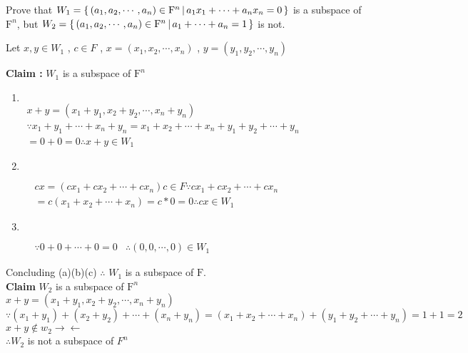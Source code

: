 Prove that $W_1 = \left\{ \,\left(a_1,a_2,\cdots,a_n\right) \in \mathrm{F}^n \,|\, a_1x_1+\cdots+a_nx_n = 0 \,\right\}$ is a subspace of $\mathrm{F}^n$, but $W_2 = \left\{ \, \left( a_1,a_2,\cdots ,a_n \right) \in \mathrm{F}^n \, | \, a_1+\cdots+a_n = 1 \,\right\}$ is not.

\begin{tcolorbox}
\begin{solution}
	Let $x,y \in W_1$ , $c \in F$ , $x = (x_1,x_2,\cdots,x_n)$ , $y=(y_1,y_2,\cdots,y_n)$
	
	\textbf{Claim : }$W_1$ is a subspace of $\mathrm{F}^n$
	\begin{enumerate}
		\item $ $\\ 
		$\begin{array}{ll}
		x+y  =  (x_1+y_1,x_2+y_2,\cdots,x_n+y_n)  \\ 
		\because x_1 + y_1 + \cdots +  x_n + y_n   =   x_1 +x_2 +\cdots +x_n + y_1 + y_2 + \cdots + y_n   \\
		  =  0 + 0   =  0 \therefore x+y \in W_1
		\end{array}$
		\item $ $
		
		$\begin{array}{lll}
			&cx = (cx_1+cx_2+\cdots + cx_n)  c \in F \because cx_1+cx_2+\cdots+cx_n\\
			& =c(x_1+x_2+\cdots+x_n) = c*0 = 0
			\therefore cx \in W_1 
		\end{array}$
		\item $ $		
		
		$\begin{array}{lll}
			&\because 0+0+\cdots+0=0   
			&\therefore (0,0,\cdots,0) \in W_1 
		\end{array}$
	\end{enumerate}
	
	Concluding (a)(b)(c) $\therefore$ $W_1$ is a subspace of $\mathrm{F}$.\\
	\textbf{Claim} $W_2$ is a subspace of $\mathrm{F}^n$\\
	$x+y = (x_1+y_1,x_2+y_2,\cdots,x_n+y_n)$\\
	$\because (x_1+y_1)+(x_2+y_2)+\cdots+(x_n+y_n) = (x_1+x_2+\cdots+x_n)+(y_1+y_2+\cdots+y_n) = 1 + 1 = 2$\\
	$x + y \notin w_2  \rightarrow\leftarrow$\\
	$\therefore W_2$ is not a subspace of $F^n$ 
\end{solution}

\end{tcolorbox}
